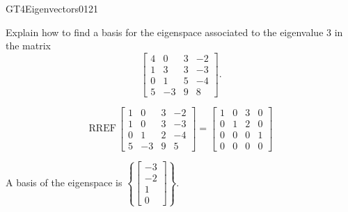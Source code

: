 \begin{exercise}{GT4}{Eigenvectors}{0121} 
\begin{exerciseStatement} 

Explain how to find a basis for the eigenspace associated to the eigenvalue \(3\) in the matrix \[\left[\begin{array}{cccc}
4 & 0 & 3 & -2 \\
1 & 3 & 3 & -3 \\
0 & 1 & 5 & -4 \\
5 & -3 & 9 & 8
\end{array}\right].\]

 \end{exerciseStatement}
 \begin{exerciseAnswer} 

\[\mathrm{RREF}\,\left[\begin{array}{cccc}
1 & 0 & 3 & -2 \\
1 & 0 & 3 & -3 \\
0 & 1 & 2 & -4 \\
5 & -3 & 9 & 5
\end{array}\right]=\left[\begin{array}{cccc}
1 & 0 & 3 & 0 \\
0 & 1 & 2 & 0 \\
0 & 0 & 0 & 1 \\
0 & 0 & 0 & 0
\end{array}\right]\]

 

A basis of the eigenspace is \(\left\{ \left[\begin{array}{c}
-3 \\
-2 \\
1 \\
0
\end{array}\right] \right\}\).

 \end{exerciseAnswer}
 \end{exercise}


\newpage




